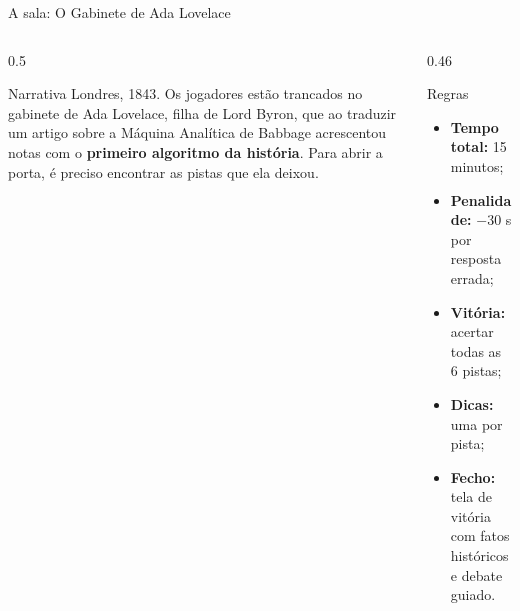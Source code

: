 \documentclass[aspectratio=169, 10pt, t]{beamer}
\begin{document}
\begin{frame}{A sala: O Gabinete de Ada Lovelace}
  \begin{columns}[T]
    \begin{column}{0.5\textwidth}
      \begin{card}{Narrativa}
        Londres, 1843. Os jogadores estão trancados no gabinete de Ada Lovelace, filha de Lord Byron, que ao traduzir um artigo sobre a Máquina Analítica de Babbage acrescentou notas com o \textbf{primeiro algoritmo da história}. Para abrir a porta, é preciso encontrar as pistas que ela deixou.
      \end{card}
    \end{column}
    \begin{column}{0.46\textwidth}
      \begin{card}{Regras}
        \begin{itemize}
          \item \textbf{Tempo total:} 15 minutos;
          \item \textbf{Penalidade:} $-30$ s por resposta errada;
          \item \textbf{Vitória:} acertar todas as 6 pistas;
          \item \textbf{Dicas:} uma por pista;
          \item \textbf{Fecho:} tela de vitória com fatos históricos e debate guiado.
        \end{itemize}
      \end{card}
    \end{column}
  \end{columns}
\end{frame}
\end{document}
